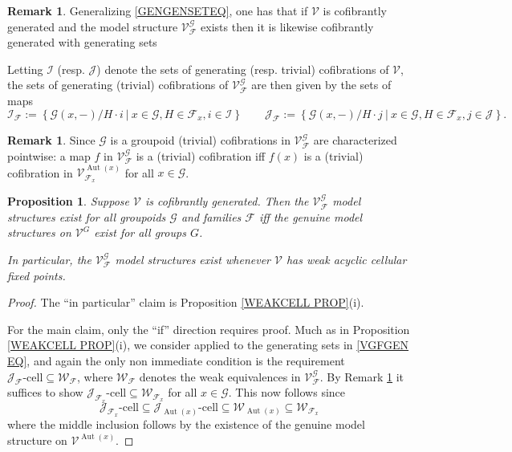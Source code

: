 \documentclass[a4paper,10pt
,draft
]{article}%
\numberwithin{equation}{section}
\numberwithin{figure}{section}
\newtheorem{proposition}[equation]{Proposition}%
\theoremstyle{definition} %
\newtheorem{remark}[equation]{Remark}%
\DeclareMathOperator{\Aut}{Aut}%
\newcommand{\F}{\ensuremath{\mathcal F}}
\newcommand{\V}{\ensuremath{\mathcal V}}
\newcommand{\G}{\ensuremath{\mathcal G}}
\newcommand{\1}{\ensuremath{\mathbbm 1}}%
\begin{document}
\begin{remark}\label{VGFGEN REM}
	Generalizing \eqref{GENGENSETEQ}, one has that if 
	$\V$ is cofibrantly generated and 
	the model structure $\V^{\G}_{\F}$ exists
	then it is likewise cofibrantly generated with generating sets
	
	Letting $\mathcal{I}$ (resp. $\mathcal{J}$)
	denote the sets of generating (resp. trivial) cofibrations of 
	$\V$, the sets of generating (trivial) cofibrations of $\V^{\G}_{\F}$ are then given by the sets of maps
\begin{equation}\label{VGFGEN EQ}
	\mathcal I_{\F} := \left\{
	\G(x,-)/H \cdot i
	\ | \ x \in \G, H \in \F_x, i\in \mathcal{I}
	\right\}
	\qquad
	\mathcal J_{\F} := \left\{
	\G(x,-)/H \cdot j
	\ | \ x \in \G, H \in \F_x, j\in \mathcal{J}
	\right\}.
\end{equation}
\end{remark}


\begin{remark}\label{SIGMACOF_REM}
	Since $\G$ is a groupoid 
	(trivial) cofibrations in $\V^{\G}_{\F}$
	are characterized pointwise:
	a map $f$ in $\V^\G_\F$ is a (trivial) cofibration iff $f(x)$ is a (trivial) cofibration in $\V^{\Aut(x)}_{\F_x}$ for all $x \in \G$.
\end{remark}



\begin{proposition}\label{ALLEQ PROP}
Suppose $\V$ is cofibrantly generated.
%
Then the $\V^{\G}_{\F}$
model structures exist for all 
groupoids $\G$ and families $\F$
iff
the genuine model structures on $\V^G$
exist for all groups $G$.

In particular, the $\V^{\G}_{\F}$
model structures exist whenever $\V$ has weak acyclic cellular fixed points.
\end{proposition}

\begin{proof}
The ``in particular'' claim is Proposition \ref{WEAKCELL PROP}(i).

For the main claim, only the ``if'' direction requires proof.
Much as in Proposition \ref{WEAKCELL PROP}(i), 
we consider \cite[Theorem 2.1.19]{Hov99}
applied to the generating sets in \eqref{VGFGEN EQ},
and again the only non immediate condition is the requirement
$\mathcal{J}_{\F}\text{-cell} \subseteq \mathcal{W}_{\F}$,
where $\mathcal{W}_{\F}$ denotes the weak equivalences 
in $\V^{\G}_{\F}$.
By Remark \ref{SIGMACOF_REM} it suffices to show 
$\mathcal{J}_{\F_x}\text{-cell} \subseteq \mathcal{W}_{\F_x}$
for all $x \in \G$.
This now follows since
\begin{equation}\label{FAMTOGEN EQ}
\mathcal{J}_{\F_x}\text{-cell} \subseteq 
\mathcal{J}_{\Aut(x)}\text{-cell} \subseteq 
\mathcal{W}_{\Aut(x)} \subseteq 
\mathcal{W}_{\F_x}
\end{equation}
where the middle inclusion follows by the existence of the 
genuine model structure on $\V^{\Aut(x)}$.
\end{proof}
\end{document}
